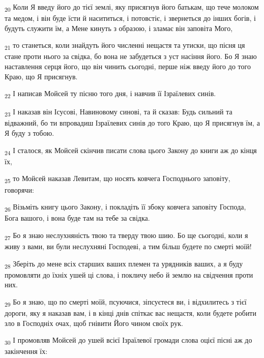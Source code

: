 \begin{tcolorbox}
\textsubscript{20} Коли Я введу його до тієї землі, яку присягнув його батькам, що тече молоком та медом, і він буде їсти й насититься, і потовстіє, і звернеться до інших богів, і будуть служити їм, а Мене кинуть з образою, і зламає він заповіта Мого,
\end{tcolorbox}
\begin{tcolorbox}
\textsubscript{21} то станеться, коли знайдуть його численні нещастя та утиски, що пісня ця стане проти нього за свідка, бо вона не забудеться з уст насіння його. Бо Я знаю наставлення серця його, що він чинить сьогодні, перше ніж введу його до того Краю, що Я присягнув.
\end{tcolorbox}
\begin{tcolorbox}
\textsubscript{22} І написав Мойсей ту пісню того дня, і навчив її Ізраїлевих синів.
\end{tcolorbox}
\begin{tcolorbox}
\textsubscript{23} І наказав він Ісусові, Навиновому синові, та й сказав: Будь сильний та відважний, бо ти впровадиш Ізраїлевих синів до того Краю, що Я присягнув їм, а Я буду з тобою.
\end{tcolorbox}
\begin{tcolorbox}
\textsubscript{24} І сталося, як Мойсей скінчив писати слова цього Закону до книги аж до кінця їх,
\end{tcolorbox}
\begin{tcolorbox}
\textsubscript{25} то Мойсей наказав Левитам, що носять ковчега Господнього заповіту, говорячи:
\end{tcolorbox}
\begin{tcolorbox}
\textsubscript{26} Візьміть книгу цього Закону, і покладіть її збоку ковчега заповіту Господа, Бога вашого, і вона буде там на тебе за свідка.
\end{tcolorbox}
\begin{tcolorbox}
\textsubscript{27} Бо я знаю неслухняність твою та тверду твою шию. Бо ще сьогодні, коли я живу з вами, ви були неслухняні Господеві, а тим більш будете по смерті моїй!
\end{tcolorbox}
\begin{tcolorbox}
\textsubscript{28} Зберіть до мене всіх старших ваших племен та урядників ваших, а я буду промовляти до їхніх ушей ці слова, і покличу небо й землю на свідчення проти них.
\end{tcolorbox}
\begin{tcolorbox}
\textsubscript{29} Бо я знаю, що по смерті моїй, псуючися, зіпсуєтеся ви, і відхилитесь з тієї дороги, яку я наказав вам, і в кінці днів спіткає вас нещастя, коли будете робити зло в Господніх очах, щоб гнівити Його чином своїх рук.
\end{tcolorbox}
\begin{tcolorbox}
\textsubscript{30} І промовляв Мойсей до ушей всієї Ізраїлевої громади слова оцієї пісні аж до закінчення їх:
\end{tcolorbox}
